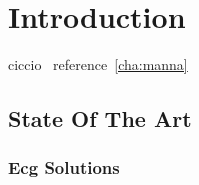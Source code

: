 
\chapter{Introduction}
ciccio~\label{cha:manna}
reference~\ref{cha:manna}

\section{State Of The Art}
\subsection{Ecg Solutions}

